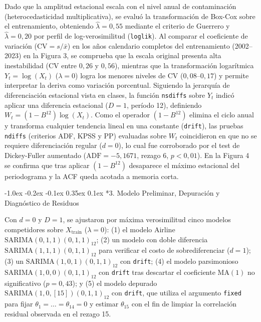 \documentclass[10pt, a4paper]{article}
\makeatletter
\renewcommand\section{\@startsection {section}{1}{\z@}%
  {-1.0ex \@plus -0.2ex \@minus -0.1ex}%
  {0.35ex \@plus 0.1ex}%
  {\normalfont\normalsize\bfseries}}
\makeatother
\begin{document}
Dado que la amplitud estacional escala con el nivel anual de contaminación (heterocedasticidad multiplicativa), se evaluó la transformación de Box-Cox sobre el entrenamiento, obteniendo $\hat{\lambda} = 0,55$ mediante el criterio de Guerrero y $\hat{\lambda} = 0,20$ por perfil de log-verosimilitud (\texttt{loglik}). Al comparar el coeficiente de variación ($\text{CV} = s/\bar{x}$) en los años calendario completos del entrenamiento (2002--2023) en la Figura 3, se comprueba que la escala original presenta alta inestabilidad ($\text{CV}$ entre $0,26$ y $0,56$), mientras que la transformación logarítmica $Y_t = \log(X_t)$ ($\lambda = 0$) logra los menores niveles de CV ($0,08\text{--}0,17$) y permite interpretar la deriva como variación porcentual. Siguiendo la jerarquía de diferenciación estacional vista en clases, la función \texttt{nsdiffs} sobre $Y_t$ indicó aplicar una diferencia estacional ($D = 1$, período 12), definiendo $W_t = (1 - B^{12})\log(X_t)$. Como el operador $(1 - B^{12})$ elimina el ciclo anual y transforma cualquier tendencia lineal en una constante (\texttt{drift}), las pruebas \texttt{ndiffs} (criterios ADF, KPSS y PP) evaluadas sobre $W_t$ coincidieron en que no se requiere diferenciación regular ($d = 0$), lo cual fue corroborado por el test de Dickey-Fuller aumentado ($\text{ADF} = -5,1671$, rezago 6, $p < 0,01$). En la Figura 4 se confirma que tras aplicar $(1 - B^{12})$ desaparece el máximo estacional del periodograma y la ACF queda acotada a memoria corta.

\section*{3. Modelo Preliminar, Depuración y Diagnóstico de Residuos}

Con $d = 0$ y $D = 1$, se ajustaron por máxima verosimilitud cinco modelos competidores sobre $X_{\text{train}}$ ($\lambda = 0$): (1) el modelo Airline $\text{SARIMA}(0,1,1)(0,1,1)_{12}$; (2) un modelo con doble diferencia $\text{SARIMA}(1,1,1)(0,1,1)_{12}$ para verificar el costo de sobrediferenciar ($d = 1$); (3) un $\text{SARIMA}(1,0,1)(0,1,1)_{12}$ con \texttt{drift}; (4) el modelo parsimonioso $\text{SARIMA}(1,0,0)(0,1,1)_{12}$ con \texttt{drift} tras descartar el coeficiente $\text{MA}(1)$ no significativo ($p = 0,43$); y (5) el modelo depurado $\text{SARIMA}(1,0,[15])(0,1,1)_{12}$ con \texttt{drift}, que utiliza el argumento \texttt{fixed} para fijar $\theta_1 = \dots = \theta_{14} = 0$ y estimar $\theta_{15}$ con el fin de limpiar la correlación residual observada en el rezago 15.
\end{document}

